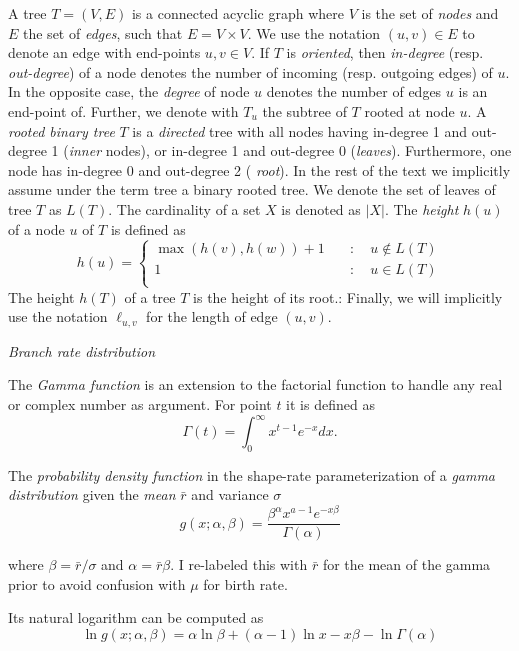 \documentclass[12pt,letterpaper]{article}
\newcommand{\ejmcomment}[1]{{\color{green} #1}}
\renewcommand{\subsection}[1]{%
\bigskip
\begin{center}
\begin{large}
\normalfont\itshape #1
\end{large}
\end{center}}
\begin{document}
A tree $T=(V,E)$ is a connected acyclic graph where $V$ is the set of {\em
nodes} and $E$ the set of {\em edges}, such that $E = V\times V$. We use the
notation $(u,v) \in E$ to denote an edge with end-points $u,v \in V$. If $T$ is
{\em oriented}, then {\em in-degree} (resp. {\em out-degree}) of a node denotes
the number of incoming (resp. outgoing edges) of $u$. In the opposite case, the
{\em degree} of node $u$ denotes the number of edges $u$ is an end-point of.
Further, we denote with $T_u$ the subtree of $T$ rooted at node $u$.  A {\em
rooted binary tree} $T$ is a {\em directed} tree with all nodes having
in-degree 1 and out-degree 1 ({\em inner} nodes), or in-degree 1 and out-degree
0 ({\em leaves}). Furthermore, one node has in-degree 0 and out-degree 2 ({\em
root}).  In the rest of the text we implicitly assume under the term tree a
binary rooted tree.  We denote the set of leaves of tree $T$ as $L(T)$.  The
cardinality of a set $X$ is denoted as $|X|$. The {\em height} $h(u)$ of a node
$u$ of $T$ is defined as
%
\[ h(u) = \left\{ \begin{array}{ll}
\max(h(v), h(w)) + 1 & \quad : \quad u \notin L(T)\\
1                    & \quad : \quad u    \in L(T)\\
\end{array}\right. \] 
The height $h(T)$ of a tree $T$ is the height of its root.: Finally, we will
implicitly use the notation $\ell_{u,v}$ for the length of edge $(u,v)$.

\subsection{Branch rate distribution}

The {\em Gamma function} is an extension to the factorial function to handle
any real or complex number as argument. For point $t$ it is defined as
$$\Gamma(t) = \int_0^\infty x^{t-1} e^{-x} dx.$$

The {\em probability density function} in the shape-rate parameterization of a
{\em gamma distribution} given the {\em mean} $\bar{r}$ and variance $\sigma$
$$ g(x;\alpha,\beta) = \frac{\beta^{\alpha}x^{a-1}e^{-x\beta}}{\Gamma(\alpha)} $$

where $\beta = \bar{r} / \sigma$ and $\alpha = \bar{r} \beta$.
\ejmcomment{I re-labeled this with $\bar{r}$ for the mean of the gamma prior to avoid confusion with $\mu$ for birth rate.}

Its natural logarithm can be computed as
$$ \ln g(x;\alpha,\beta) = \alpha\ln\beta + (\alpha-1)\ln x -x\beta - \ln\Gamma(\alpha) $$
\end{document}
